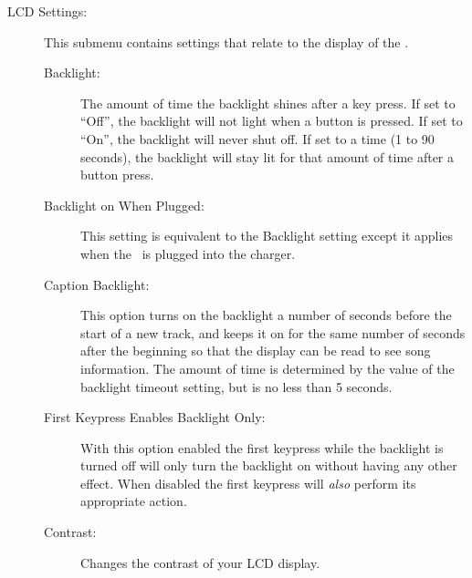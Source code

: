 \begin{description}
  \item[LCD Settings:]
    This submenu contains settings that relate to the display of the \dap.
    \begin{description}
    \item[Backlight:]
    The amount of time the backlight shines after a key press. If set to 
    ``Off'', the backlight will not light when a button is pressed. If 
    set to ``On'', the backlight will never shut off. If set to a time 
    (1 to 90 seconds), the backlight will stay lit for that amount of time 
    after a button press.
    \item[Backlight on When Plugged:]
    This setting is equivalent to the Backlight setting except it applies when
    the \dap\ is plugged into the charger. 
    \item[Caption Backlight:] 
    This option turns on the backlight a number of seconds before the start
    of a new track, and keeps it on for the same number of seconds after the
    beginning so that the display can be read to see song information. The
    amount of time is determined by the value of the backlight timeout
    setting, but is no less than 5 seconds.
    \item[First Keypress Enables Backlight Only:]
    With this option enabled the first keypress while the backlight is turned 
    off will only turn the backlight on without having any other effect. When
    disabled the first keypress will \emph{also} perform its appropriate action.
    \item[Contrast:] 
    Changes the contrast of your LCD display. 

\end{description}
\end{description}
